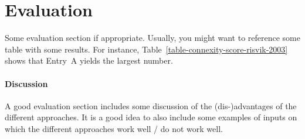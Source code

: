\section{Evaluation} \label{evaluation}

Some evaluation section if appropriate. Usually, you might want to reference some table with some results. For instance, Table~\ref{table-connexity-score-risvik-2003} shows that Entry~A yields the largest number.

\paragraph{Discussion} A good evaluation section includes some discussion of the (dis-)advantages of the different approaches. It is a good idea to also include some examples of inputs on which the different approaches work well / do not work well.
